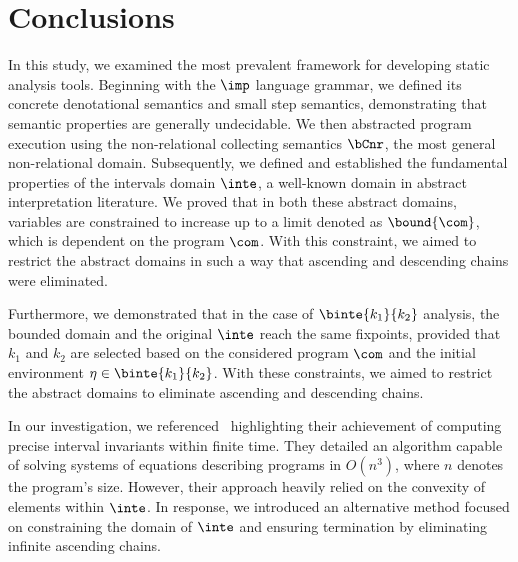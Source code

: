 \chapter{Conclusions}\label{ch:conclusion}

In this study, we examined the most prevalent framework for developing
static analysis tools. Beginning with the \(\imp\) language grammar,
we defined its concrete denotational semantics and small step
semantics, demonstrating that semantic properties are generally
undecidable. We then abstracted program execution using the
non-relational collecting semantics \(\bCnr\), the most general
non-relational domain. Subsequently, we defined and established the
fundamental properties of the intervals domain \(\inte\), a well-known
domain in abstract interpretation literature. We proved that in both
these abstract domains, variables are constrained to increase up to a
limit denoted as \(\bound{\com}\), which is dependent on the program
\(\com\). With this constraint, we aimed to restrict the abstract
domains in such a way that ascending and descending chains were
eliminated.

Furthermore, we demonstrated that in the case of \(\binte{k_1}{k_2}\)
analysis, the bounded domain and the original \(\inte\) reach the same
fixpoints, provided that \(k_1\) and \(k_2\) are selected based on the
considered program \(\com\) and the initial environment
\(\eta \in \binte{k_1}{k_2}\). With these constraints, we aimed to
restrict the abstract domains to eliminate ascending and descending
chains.

In our investigation, we referenced~\cite{Gawlitza2009}
highlighting their achievement of computing precise interval
invariants within finite time. They detailed an algorithm capable of
solving systems of equations describing programs in \(O(n^3)\), where
\(n\) denotes the program's size. However, their approach heavily
relied on the convexity of elements within \(\inte\). In response, we
introduced an alternative method focused on constraining the domain of
\(\inte\) and ensuring termination by eliminating infinite ascending
chains.

